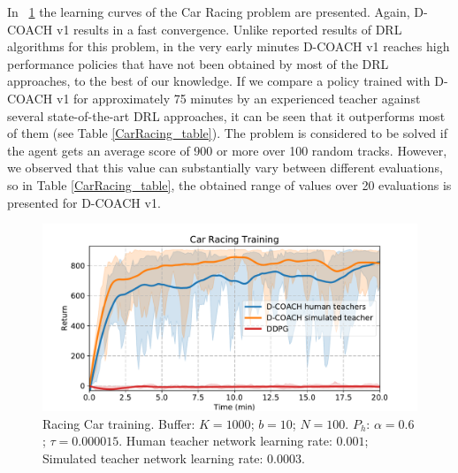 In \figurename~{\ref{fig:racing_car_results}} the learning curves of the Car Racing problem are presented. Again, D-COACH v1 results in a fast convergence. Unlike reported results of DRL algorithms for this problem, in the very early minutes D-COACH v1 reaches high performance policies that have not been obtained by most of the DRL approaches, to the best of our knowledge. If we compare a policy trained with D-COACH v1 for approximately 75 minutes by an experienced teacher against several state-of-the-art DRL approaches, it can be seen that it outperforms most of them (see Table \ref{CarRacing_table}). The problem is considered to be solved if the agent gets an average score of 900 or more over 100 random tracks. However, we observed that this value can substantially vary between different evaluations, so in Table \ref{CarRacing_table}, the obtained range of values over 20 evaluations is presented for D-COACH v1.
\vspace{-0.4cm}

\begin{figure}[t]
    \centering
    \vspace{-0.2cm}
    \includegraphics[width=0.9\linewidth]{imagenes/cap3/offline_car_racing_humans.pdf}
    \vspace{-0.2cm}
    \caption{Racing Car training. Buffer: $K = 1000$; $b = 10$; $N = 100$. $P_{h}$: $\alpha = 0.6$; $\tau = 0.000015$. Human teacher network learning rate: $0.001$; Simulated teacher network learning rate: $0.0003$.}
    \label{fig:racing_car_results}
\end{figure}

